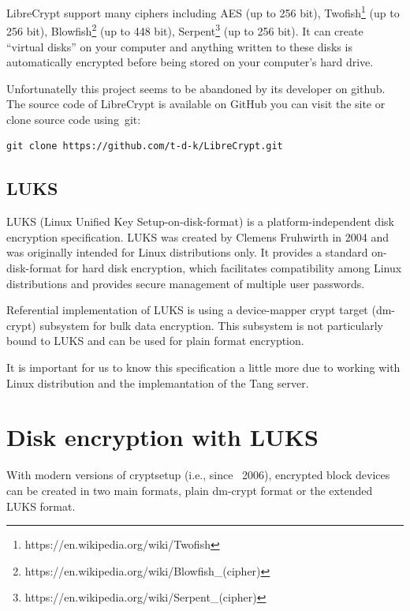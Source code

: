 LibreCrypt support many ciphers including AES (up to 256 bit), Twofish\footnote{https://en.wikipedia.org/wiki/Twofish} (up to 256 bit), Blowfish\footnote{https://en.wikipedia.org/wiki/Blowfish\_(cipher)} (up to 448 bit), Serpent\footnote{https://en.wikipedia.org/wiki/Serpent\_(cipher)} (up to 256 bit)\cite{librecrypt}.
It can create “virtual disks” on your computer and anything written to these disks is automatically encrypted before being stored on your computer’s hard drive\cite{FreeOTFE}.

Unfortunatelly this project seems to be abandoned by its developer on github.
The source code of LibreCrypt is available on GitHub you can visit the site or clone source code using~git:
\begin{lstlisting}[columns=fixed,basicstyle=\ttfamily\footnotesize,tabsize=4,backgroundcolor=\color{yellow!10}]
git clone https://github.com/t-d-k/LibreCrypt.git
\end{lstlisting}

\subsection{LUKS}

LUKS (Linux Unified Key Setup-on-disk-format) is a platform-independent disk encryption specification.
LUKS was created by Clemens Fruhwirth in 2004 and was originally intended for Linux distributions only.
It provides a standard on-disk-format for hard disk encryption, which facilitates compatibility among Linux distributions and provides secure management of multiple user passwords.

Referential implementation of LUKS is using a device-mapper crypt target (dm-crypt) subsystem for bulk data encryption.
This subsystem is not particularly bound to LUKS and can be used for plain format encryption.

It is important for us to know this specification a little more due to working with Linux distribution and the implemantation of the Tang server.

\section{Disk encryption with LUKS} 

With modern versions of cryptsetup (i.e., since ~2006), encrypted block devices can be created in two main formats, plain dm-crypt format or the extended LUKS format.

